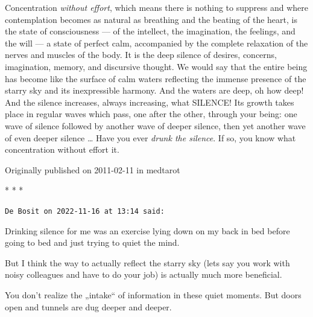 \begin{quotex}
Concentration \emph{without effort}, which means there is nothing to suppress and where contemplation becomes as natural as breathing and the beating of the heart, is the state of consciousness — of the intellect, the imagination, the feelings, and the will — a state of perfect calm, accompanied by the complete relaxation of the nerves and muscles of the body. It is the deep silence of desires, concerns, imagination, memory, and discursive thought. We would say that the entire being has become like the surface of calm waters reflecting the immense presence of the starry sky and its inexpressible harmony. And the waters are deep, oh how deep! And the silence increases, always increasing, what SILENCE! Its growth takes place in regular waves which pass, one after the other, through your being: one wave of silence followed by another wave of deeper silence, then yet another wave of even deeper silence … Have you ever \emph{drunk the silence}. If so, you know what concentration without effort it.

\end{quotex}
Originally published on 2011-02-11 in medtarot




\begin{center}* * *\end{center}

\begin{footnotesize}\begin{sffamily}



\texttt{De Bosit on 2022-11-16 at 13:14 said: }

Drinking silence for me was an exercise lying down on my back in bed before going to bed and just trying to quiet the mind. 

But I think the way to actually reflect the starry sky (lets say you work with noisy colleagues and have to do your job) is actually much more beneficial.

You don't realize the „intake`` of information in these quiet moments. But doors open and tunnels are dug deeper and deeper.


\end{sffamily}\end{footnotesize}
